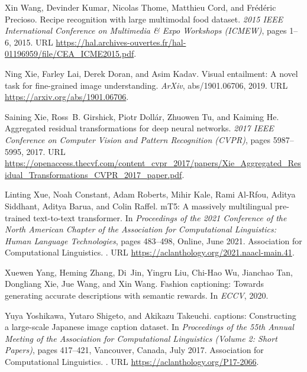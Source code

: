 \documentclass{bmvc2k}
\begin{document}
\begin{thebibliography}{63}
Xin Wang, Devinder Kumar, Nicolas Thome, Matthieu Cord, and Fr{\'e}d{\'e}ric
  Precioso.
\newblock Recipe recognition with large multimodal food dataset.
\newblock \emph{2015 IEEE International Conference on Multimedia \& Expo
  Workshops (ICMEW)}, pages 1--6, 2015.
\newblock URL
  \url{https://hal.archives-ouvertes.fr/hal-01196959/file/CEA_ICME2015.pdf}.

Ning Xie, Farley Lai, Derek Doran, and Asim Kadav.
\newblock Visual entailment: A novel task for fine-grained image understanding.
\newblock \emph{ArXiv}, abs/1901.06706, 2019.
\newblock URL \url{https://arxiv.org/abs/1901.06706}.

Saining Xie, Ross~B. Girshick, Piotr Doll{\'a}r, Zhuowen Tu, and Kaiming He.
\newblock Aggregated residual transformations for deep neural networks.
\newblock \emph{2017 IEEE Conference on Computer Vision and Pattern Recognition
  (CVPR)}, pages 5987--5995, 2017.
\newblock URL
  \url{https://openaccess.thecvf.com/content_cvpr_2017/papers/Xie_Aggregated_Residual_Transformations_CVPR_2017_paper.pdf}.

Linting Xue, Noah Constant, Adam Roberts, Mihir Kale, Rami Al-Rfou, Aditya
  Siddhant, Aditya Barua, and Colin Raffel.
\newblock m{T}5: A massively multilingual pre-trained text-to-text transformer.
\newblock In \emph{Proceedings of the 2021 Conference of the North American
  Chapter of the Association for Computational Linguistics: Human Language
  Technologies}, pages 483--498, Online, June 2021. Association for
  Computational Linguistics.
\newblock {}.
\newblock URL \url{https://aclanthology.org/2021.naacl-main.41}.

Xuewen Yang, Heming Zhang, Di~Jin, Yingru Liu, Chi-Hao Wu, Jianchao Tan,
  Dongliang Xie, Jue Wang, and Xin Wang.
\newblock Fashion captioning: Towards generating accurate descriptions with
  semantic rewards.
\newblock In \emph{ECCV}, 2020.

Yuya Yoshikawa, Yutaro Shigeto, and Akikazu Takeuchi.
 captions: Constructing a large-scale {J}apanese image caption
  dataset.
\newblock In \emph{Proceedings of the 55th Annual Meeting of the Association
  for Computational Linguistics (Volume 2: Short Papers)}, pages 417--421,
  Vancouver, Canada, July 2017. Association for Computational Linguistics.
\newblock {}.
\newblock URL \url{https://aclanthology.org/P17-2066}.


\end{thebibliography}
\end{document}

